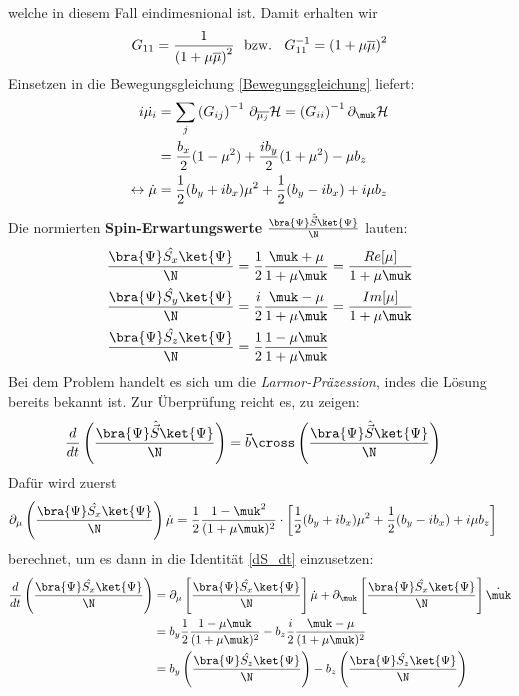 welche in diesem Fall eindimesnional ist.
Damit erhalten wir
\begin{align}
    G_{11} = \frac{1}{\left(1 + \mu\overline{\mu}\right)^2} \text{\space\space bzw.\space\space } G_{11}^{-1} = \left(1 + \mu\overline{\mu}\right)^2
\end{align}
\noindent Einsetzen in die Bewegungsgleichung \autoref{Bewegungsgleichung} liefert:
\begin{align}
    i\dot{\mu_i} &= \sum_{j}\left(G_{ij}\right)^{-1}\thinspace \partial_{\overline{\mu_j}}\mathcal{H} = \left(G_{ii}\right)^{-1}\partial_{\muk} \mathcal{H} \\
    &= \frac{b_x}{2}(1-\mu^2) + \frac{i b_y }{2}(1+\mu^2) -\mu b_z   \label{Larmor} \\ 
    \leftrightarrow \dot{\mu} &= \frac{1}{2}(b_y + ib_x)\mu^2 + \frac{1}{2}(b_y - ib_x) +i\mu b_z
\end{align}
Die normierten \textbf{Spin-Erwartungswerte} $\frac{\bra{\Psi}\hat{\vec{S}}\ket{\Psi}}{\N}$ lauten:
\begin{align}
    \frac{\bra{\Psi}\hat{S_x}\ket{\Psi}}{\N} &= \frac{1}{2}\frac{\muk + \mu}{1+\mu\muk} = \frac{Re[\mu]}{1 + \mu\muk} \\
    \frac{\bra{\Psi}\hat{S_y}\ket{\Psi}}{\N} &= \frac{i}{2}\frac{\muk - \mu}{1+\mu\muk} = \frac{Im[\mu]}{1 + \mu\muk} \\
    \frac{\bra{\Psi}\hat{S_z}\ket{\Psi}}{\N} &= \frac{1}{2}\frac{1 - \mu\muk}{1 + \mu\muk}  
\end{align}
Bei dem Problem handelt es sich um die \textit{Larmor-Präzession}, indes die Lösung bereits bekannt ist. Zur Überprüfung reicht es,
 zu zeigen:
\begin{align}
    \frac{d}{dt}\left(\frac{\bra{\Psi}\hat{\vec{S}}\ket{\Psi}}{\N}\right) &= \vec{b} \cross \left(\frac{\bra{\Psi}\hat{\vec{S}}\ket{\Psi}}{\N}\right)
\end{align}
Dafür wird zuerst 
\begin{align}
    \partial_\mu \left(\frac{\bra{\Psi}\hat{S_x}\ket{\Psi}}{\N}\right)\dot{\mu} &= \frac{1}{2}\frac{1-\muk^2}{(1+\mu\muk)^2}\cdot\left[\frac{1}{2}(b_y + ib_x)\mu^2 + \frac{1}{2}(b_y - ib_x) +i\mu b_z\right] \label{dS_dmu}  
\end{align}
berechnet, um es dann in die Identität \ref{dS_dt} einzusetzen:
\begin{align}
    \frac{d}{dt}\left(\frac{\bra{\Psi}\hat{S_x}\ket{\Psi}}{\N}\right) &= \partial_{\mu}\left[\frac{\bra{\Psi}\hat{S_x}\ket{\Psi}}{\N}\right]\dot{\mu} + \partial_{\muk}\left[\frac{\bra{\Psi}\hat{S_x}\ket{\Psi}}{\N}\right]\dot{\muk}\label{dS_dt}\\
    &= b_y \frac{1}{2}\frac{1-\mu\muk}{(1+\mu\muk)^2} - b_z \frac{i}{2}\frac{\muk -\mu}{(1+\mu\muk)^2}    \\
    &= b_y\left(\frac{\bra{\Psi}\hat{S_z}\ket{\Psi}}{\N}\right) - b_z\left(\frac{\bra{\Psi}\hat{S_z}\ket{\Psi}}{\N}\right)
\end{align}
